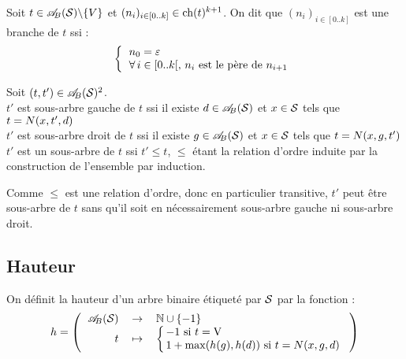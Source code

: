 		\eqskip{2mm}
		\colsep{1.5pt}
		\begin{Definition}[branche]
			Soit \(t\in\AB(\cal{S})\backslash\{V\}\) et \((n_i)_{i\in[0..k]}\in\ch(t)^{k+1}\).
			On dit que \((n_i)_{i\in[0..k]}\) est une branche de \(t\) ssi :
				\[
					\left\{ \begin{tabular}[h]{l}
						\(n_0 = \varepsilon\) \\
						\(\forall\,i\in[0..k[\), \(n_i\) est le père de \(n_{i+1}\)
					\end{tabular} \right.
				\]
		\end{Definition}
		
		\begin{Definition}
			Soit \((t,t')\in\AB(\cal{S})^2\). \\
				 \bdot \(t'\) est sous-arbre gauche de \(t\) ssi il existe \(d\in\AB(\cal{S})\) et \(x\in\cal{S}\) tels que \(t = \N(x,t',d)\) \\
				 \bdot \(t'\) est sous-arbre droit de \(t\) ssi il existe \(g\in\AB(\cal{S})\) et \(x\in\cal{S}\) tels que \(t = \N(x,g,t')\) \\
				 \bdot \(t'\) est un sous-arbre de \(t\) ssi \(t' \leqslant t\), \(\leqslant\) étant la relation d'ordre induite par la construction de l'ensemble par induction.
		\end{Definition}
		
		\begin{Remarque}
			Comme \(\leqslant\) est une relation d'ordre, donc en particulier transitive, \(t'\) peut être sous-arbre de \(t\) sans qu'il soit en nécessairement sous-arbre gauche ni sous-arbre droit.
		\end{Remarque}
	
	\subsection{Hauteur}
		
		\colsep{2.2pt}
		\eqskip{3mm}
		\begin{Definition}
			On définit la hauteur d'un arbre binaire étiqueté par \(\cal{S}\) par la fonction :
				\[
					h = \fun{\AB(\cal{S})}{\bb{N}\cup\{-1\}}{t}{
						\left\{ \colsep{1.5pt} \begin{tabular}[h]{l}
							\(-1\) si \(t = \V\) \\
							\(1 + \max(h(g),h(d))\) si \(t = \N(x,g,d)\)
						\end{tabular} \right.
					}
				\]
		\end{Definition}
		
